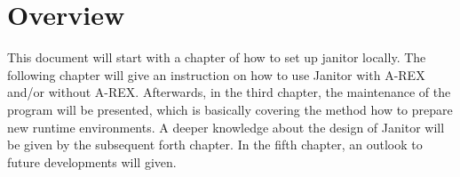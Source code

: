 \section{Overview}

This document will start with a chapter of how to set up janitor locally. The following chapter will give an instruction on how to 
use Janitor with A-REX and/or without A-REX. Afterwards, in the third chapter, the maintenance of the program will be presented, 
which is basically covering the method how to prepare new runtime environments. A deeper knowledge about the design of Janitor will 
be given by the subsequent forth chapter. In the fifth chapter, an outlook to future developments will given.






 

